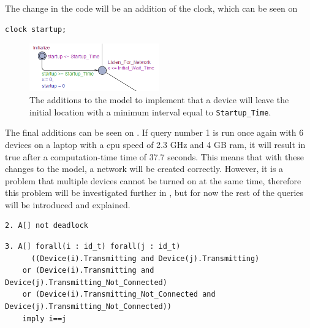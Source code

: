 The change in the code will be an addition of the clock, which can be seen on 
\begin{lstlisting}[style=UPPAAL, caption={Addition of the \texttt{startup} clock}, label={lst:Clock_Addition}]
clock startup;
\end{lstlisting}

\begin{figure}
    \hspace{-10pt}
    \vspace{-10pt}
  \includegraphics[width=0.5\textwidth]{Figures/Model/IntervalStartup.png} 
\caption{The additions to the model to implement that a device will leave the initial location with a minimum interval equal to \texttt{Startup\_Time}.}
\label{fig:OneStartUp}
\end{figure}

The final additions can be seen on .
If query number 1 is run once again with 6 devices on a laptop with a cpu speed of 2.3 GHz and 4 GB ram, it will result in true after a computation-time time of 37.7 seconds.
This means that with these changes to the model, a network will be created correctly.
However, it is a problem that multiple devices cannot be turned on at the same time, therefore this problem will be investigated further in , but for now the rest of the queries will be introduced and explained.

\begin{lstlisting}[style=UPPAAL, title={The query requires that there is no deadlock in the system, when run with 6 devices on the same laptop as before, it will result in true with a computation-time of 84.8 seconds when run on the same laptop as before.}]
2. A[] not deadlock
\end{lstlisting}

\begin{lstlisting}[style=UPPAAL, title={This query requires that no pair of devices are in the ``Transmitting'' state at the same time. The query will, when run with 6 devices and the same laptop, result in true with a computation-time of 67.7 seconds.}]
3. A[] forall(i : id_t) forall(j : id_t) 
      ((Device(i).Transmitting and Device(j).Transmitting) 
    or (Device(i).Transmitting and Device(j).Transmitting_Not_Connected) 
    or (Device(i).Transmitting_Not_Connected and Device(j).Transmitting_Not_Connected)) 
    imply i==j
\end{lstlisting}


